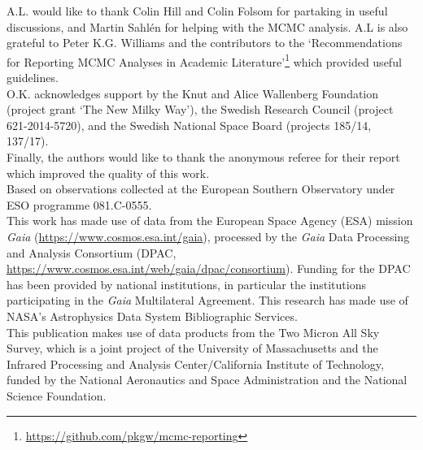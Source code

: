 \documentclass{aa}
\begin{document}
\begin{acknowledgements}
    A.L. would like to thank Colin Hill and Colin Folsom for partaking in useful discussions, and Martin Sahl\'en for helping with the MCMC analysis. A.L is also grateful to Peter K.G. Williams and the contributors to the `Recommendations for Reporting MCMC Analyses in Academic Literature'\footnote{\url{https://github.com/pkgw/mcmc-reporting}} which provided useful guidelines.\\ 
    O.K. acknowledges support by the Knut and Alice Wallenberg Foundation (project grant `The New Milky Way'), the Swedish Research Council (project 621-2014-5720), and the Swedish National Space Board (projects 185/14, 137/17).\\
    Finally, the authors would like to thank the anonymous referee for their report which improved the quality of this work.\\
    Based on observations collected at the European Southern Observatory under ESO programme 081.C-0555.\\
    This work has made use of data from the European Space Agency (ESA) mission {\it Gaia} (\url{https://www.cosmos.esa.int/gaia}), processed by the {\it Gaia} Data Processing and Analysis Consortium (DPAC, \url{https://www.cosmos.esa.int/web/gaia/dpac/consortium}). Funding for the DPAC has been provided by national institutions, in particular the institutions participating in the {\it Gaia} Multilateral Agreement.
    This research has made use of NASA’s Astrophysics Data System Bibliographic Services. \\
    This publication makes use of data products from the Two Micron All Sky Survey, which is a joint project of the University of Massachusetts and the Infrared Processing and Analysis Center/California Institute of Technology, funded by the National Aeronautics and Space Administration and the National Science Foundation.
\end{acknowledgements}


\Online
\end{document}
